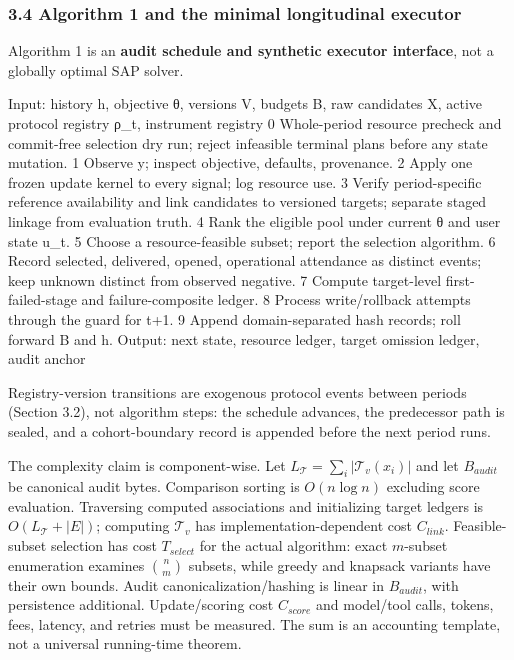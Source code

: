 \documentclass[
  11pt]{article}
\newenvironment{Shaded}{}{}
\newcommand{\NormalTok}[1]{#1}
\newcommand{\Needspace}[1]{%
  \par
  \ifdim\pagegoal>\pagetotal
    \ifdim\dimexpr\pagegoal-\pagetotal\relax<#1\relax
      \newpage
    \fi
  \fi
}
\begin{document}
\Needspace{30em}

\subsubsection{3.4 Algorithm 1 and the minimal longitudinal
executor}\label{algorithm-1-and-the-minimal-longitudinal-executor}

Algorithm 1 is an \textbf{audit schedule and synthetic executor
interface}, not a globally optimal SAP solver.

\begin{Shaded}
\begin{Highlighting}[]
\NormalTok{Input: history h, objective θ, versions V, budgets B,}
\NormalTok{       raw candidates X, active protocol registry ρ\_t, instrument registry}
\NormalTok{ 0  Whole{-}period resource precheck and commit{-}free selection dry run;}
\NormalTok{    reject infeasible terminal plans before any state mutation.}
\NormalTok{ 1  Observe y; inspect objective, defaults, provenance.}
\NormalTok{ 2  Apply one frozen update kernel to every signal; log resource use.}
\NormalTok{ 3  Verify period{-}specific reference availability and link candidates}
\NormalTok{    to versioned targets; separate staged linkage from evaluation truth.}
\NormalTok{ 4  Rank the eligible pool under current θ and user state u\_t.}
\NormalTok{ 5  Choose a resource{-}feasible subset; report the selection algorithm.}
\NormalTok{ 6  Record selected, delivered, opened, operational attendance as}
\NormalTok{    distinct events; keep unknown distinct from observed negative.}
\NormalTok{ 7  Compute target{-}level first{-}failed{-}stage and failure{-}composite ledger.}
\NormalTok{ 8  Process write/rollback attempts through the guard for t+1.}
\NormalTok{ 9  Append domain{-}separated hash records; roll forward B and h.}
\NormalTok{Output: next state, resource ledger, target omission ledger, audit anchor}
\end{Highlighting}
\end{Shaded}

Registry-version transitions are exogenous protocol events between
periods (Section 3.2), not algorithm steps: the schedule advances, the
predecessor path is sealed, and a cohort-boundary record is appended
before the next period runs.

The complexity claim is component-wise. Let
\(L_{\mathcal T}=\sum_i|\mathcal T_v(x_i)|\) and let \(B_{audit}\) be
canonical audit bytes. Comparison sorting is \(O(n\log n)\) excluding
score evaluation. Traversing computed associations and initializing
target ledgers is \(O(L_{\mathcal T}+|E|)\); computing \(\mathcal T_v\)
has implementation-dependent cost \(C_{link}\). Feasible-subset
selection has cost \(T_{select}\) for the actual algorithm: exact
\(m\)-subset enumeration examines \(\binom nm\) subsets, while greedy
and knapsack variants have their own bounds. Audit
canonicalization/hashing is linear in \(B_{audit}\), with persistence
additional. Update/scoring cost \(C_{score}\) and model/tool calls,
tokens, fees, latency, and retries must be measured. The sum is an
accounting template, not a universal running-time theorem.
\end{document}
